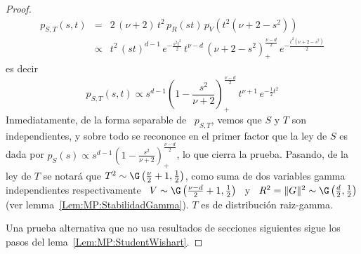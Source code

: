 \begin{proof}
  \begin{eqnarray*}
  p_{S,T}(s,t) & = & 2 \, (\nu+2) \, t^2 \, p_R(st) \, p_V\left( t^2 (\nu+2-s^2)
  \right)\\[2mm]
  & \propto & t^2 \, (s t)^{d-1} \, e^{-\frac{s^2 t^2}{2}} \, t^{\nu-d} \,
  \left( \nu+2-s^2 \right)_+^{\frac{\nu-d}{2}} \, e^{-\frac{t^2 (\nu+2-s^2)}{2}}
  \end{eqnarray*}
  es decir
  \[
  p_{S,T}(s,t)     \propto    s^{d-1}     \left(    1     -    \frac{s^2}{\nu+2}
  \right)_+^{\frac{\nu-d}{2}} \, t^{\nu+1} \, e^{-\frac12 t^2}
    \]
    Inmediatamente, de  la forma separable de  \ $p_{S,T}$, vemos que  $S$ y $T$
    son independientes, y sobre todo se recononce en el primer factor que la ley
    de  $S$ es dada  por $p_S(s)  \propto s^{d-1}  \left( 1  - \frac{s^2}{\nu+2}
    \right)_+^{\frac{\nu-d}{2}}$, lo que cierra la prueba. Pasando, de la ley de
    $T$ se notar\'a que $T^2 \sim \G\left( \frac{\nu}{2} + 1 , \frac12 \right)$,
    como suma  de dos variables  gamma independientes respectivamente \  $V \sim
    \G\left(  \frac{\nu-d}{2}+1 , \frac12  \right)$ \  y \  $R^2 =  \|G\|^2 \sim
    \G\left(        \frac{d}{2}       ,       \frac12        \right)$       (ver
    lemma~\ref{Lem:MP:StabilidadGamma}). $T$ es de distribuci\'on raiz-gamma.

    Una prueba alternativa  que no usa resultados de  secciones siguientes sigue
    los pasos del lema~\ref{Lem:MP:StudentWishart}.
\end{proof}


